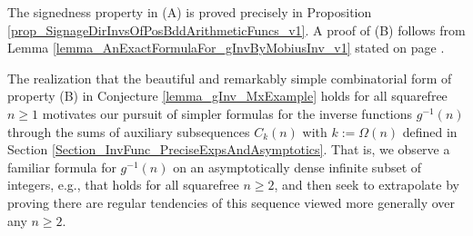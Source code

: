\documentclass[11pt,reqno,a4letter]{article}
\numberwithin{figure}{section}
\numberwithin{table}{section}
\theoremstyle{plain}
\numberwithin{theorem}{section}
\theoremstyle{definition}
\begin{document}
The signedness property in (A) is proved precisely in 
Proposition \ref{prop_SignageDirInvsOfPosBddArithmeticFuncs_v1}. 
A proof of (B) follows from 
Lemma \ref{lemma_AnExactFormulaFor_gInvByMobiusInv_v1} 
stated on page \pageref{lemma_AnExactFormulaFor_gInvByMobiusInv_v1}. 

The realization that the beautiful and remarkably simple combinatorial form of property (B) 
in Conjecture \ref{lemma_gInv_MxExample} holds for all squarefree $n \geq 1$ 
motivates our pursuit of simpler formulas for the inverse functions $g^{-1}(n)$ 
through the sums of auxiliary subsequences $C_k(n)$ with $k := \Omega(n)$ 
defined in Section \ref{Section_InvFunc_PreciseExpsAndAsymptotics}. 
That is, we observe a familiar formula for $g^{-1}(n)$ 
on an asymptotically dense infinite subset of integers, e.g., that holds for 
all squarefree $n \geq 2$, and then seek 
to extrapolate by proving there are regular tendencies of this sequence viewed 
more generally over any $n \geq 2$. 
\end{document}
